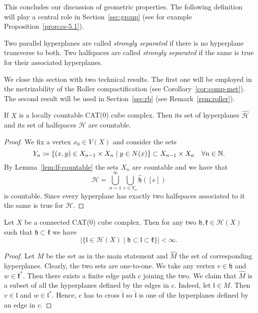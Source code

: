 This concludes our discussion of geometric properties. The following definition will play a central role in Section~\ref{sec:group} (see for example Proposition~\ref{prop:cs-5.1}).

\begin{defin}
  \label{defin:strong-sep}
  Two parallel hyperplanes are called \emph{strongly separated} if there is no hyperplane transverse to both. Two halfspaces are called \emph{strongly separated} if the same is true for their associated hyperplanes.
\end{defin}

\begin{bsp}
\end{bsp}

We close this section with two technical results. The first one will be employed in the metrizability of the Roller compactification (see Corollary~\ref{cor:comp-met}). The second result will be used in Section~\ref{sec:rb} (see Remark~\ref{rem:roller}).

\begin{cor}
  \label{cor:halfspace-countable}
  If \(X\) is a locally countable CAT(0) cube complex. Then its set of hyperplanes \(\mathcal{\hat H}\) and its set of halfspaces \(\mathcal{H}\) are countable.
\end{cor}

\begin{proof}
  We fix a vertex \(x_0 \in V(X)\) and consider the sets
  \[
    Y_n \coloneqq \{(x,y) \in X_{n-1} \times X_{n} \mid y \in N(x)\} \subset X_{n-1} \times X_n \quad \forall n \in \mathbb{N}.
  \]
  By Lemma~\ref{lem:lf-countable} the sets \(X_n\) are countable and we have that
  \[
    \mathcal{\hat H} = \bigcup_{n=1}^\infty \bigcup_{e \in Y_n} \mathfrak{\hat h}([e])
  \]
  is countable. Since every hyperplane has exactly two halfspaces associated to it the same is true for \(\mathcal{H}\).
\end{proof}


\begin{lemma}
  \label{lem:finite-interval}
  Let \(X\) be a connected CAT(0) cube complex. Then for any two \(\mathfrak{h,k} \in \mathcal{H}(X)\) such that \(\mathfrak{h} \subset \mathfrak{k}\) we have
  \[
    |\{\mathfrak{l} \in \mathcal{H}(X) \mid \mathfrak{h} \subset \mathfrak{l} \subset \mathfrak{k}\}| < \infty.
  \]
\end{lemma}

\begin{proof}
  Let \(M\) be the set as in the main statement and \(\hat M\) the set of corresponding hyperplanes. Clearly, the two sets are one-to-one. We take any vertex \(v \in \mathfrak{h}\)  and \(w \in \mathfrak{k}^\ast\). Then there exists a finite edge path \(c\) joining the two. We claim that \(\hat M\) is a subset of all the hyperplanes defined by the edges in \(c\). Indeed, let \(\mathfrak{l} \in M\). Then \(v \in \mathfrak{l}\) and \(w \in \mathfrak{l}^\ast\). Hence, \(c\) has to cross \(\mathfrak{\hat l}\) so \(\mathfrak{\hat l}\) is one of the hyperplanes defined by an edge in \(c\).
\end{proof}

